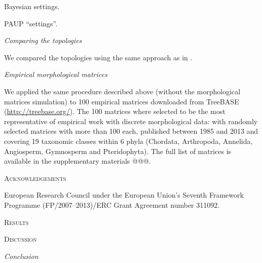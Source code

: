 \documentclass[12pt,letterpaper]{article}
\renewcommand{\section}[1]{%
\bigskip
\begin{center}
\begin{Large}
\normalfont\scshape #1
\medskip
\end{Large}
\end{center}}
\renewcommand{\subsection}[1]{%
\bigskip
\begin{center}
\begin{large}
\normalfont\itshape #1
\end{large}
\end{center}}
\begin{document}
Bayesian settings.

PAUP ``settings''.

\subsection{Comparing the topologies}

We compared the topologies using the same approach as in \cite{Guillerme2016146}.

\subsection{Empirical morphological matrices}

We applied the same procedure described above (without the morphological matrices simulation) to 100 empirical matrices downloaded from TreeBASE (\url{http://treebase.org/}).
The 100 matrices where selected to be the most representative of empirical work with discrete morphological data: with randomly selected matrices with more than 100 each, published between 1985 and 2013 and covering 19 taxonomic classes within 6 phyla (Chordata, Arthropoda, Annelida, Angiosperm, Gymnosperm and Pteridophyta).
The full list of matrices is available in the supplementary materials @@@.

\section{Acknowledgements}
European Research Council under the European Union’s Seventh Framework Programme (FP/2007–2013)/ERC Grant Agreement number 311092.


\section{Results}


\section{Discussion}


\subsection{Conclusion}




\end{document}
